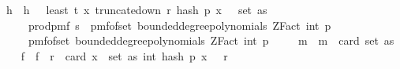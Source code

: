 \begin{isabellebody}
\ h\ \ {\isachardoublequoteopen}h\ {\isacharequal}{\kern0pt}\ {\isacharparenleft}{\kern0pt}{\isasymlambda}{\isasymomega}{\isachardot}{\kern0pt}\ least\ t\ {\isacharparenleft}{\kern0pt}{\isacharparenleft}{\kern0pt}{\isasymlambda}x{\isachardot}{\kern0pt}\ truncate{\isacharunderscore}{\kern0pt}down\ r\ {\isacharparenleft}{\kern0pt}hash\ p\ x\ {\isasymomega}{\isacharparenright}{\kern0pt}{\isacharparenright}{\kern0pt}\ {\isacharbackquote}{\kern0pt}\ set\ as{\isacharparenright}{\kern0pt}{\isacharparenright}{\kern0pt}{\isachardoublequoteclose}\isanewline
\ \ \isamarkupfalse%
\ {\isasymOmega}\ \ {\isachardoublequoteopen}{\isasymOmega}\ {\isacharequal}{\kern0pt}\ prod{\isacharunderscore}{\kern0pt}pmf\ {\isacharbraceleft}{\kern0pt}{}{\isachardot}{\kern0pt}{\isachardot}{\kern0pt}{\isacharless}{\kern0pt}s{\isacharbraceright}{\kern0pt}\ {\isacharparenleft}{\kern0pt}{\isasymlambda}{\isacharunderscore}{\kern0pt}{\isachardot}{\kern0pt}\ pmf{\isacharunderscore}{\kern0pt}of{\isacharunderscore}{\kern0pt}set\ {\isacharparenleft}{\kern0pt}bounded{\isacharunderscore}{\kern0pt}degree{\isacharunderscore}{\kern0pt}polynomials\ {\isacharparenleft}{\kern0pt}ZFact\ {\isacharparenleft}{\kern0pt}int\ p{\isacharparenright}{\kern0pt}{\isacharparenright}{\kern0pt}\ {}{\isacharparenright}{\kern0pt}{\isacharparenright}{\kern0pt}{\isachardoublequoteclose}\isanewline
\ \ \isamarkupfalse%
\ {\isasymOmega}\ \ {\isachardoublequoteopen}{\isasymOmega}\ {\isacharequal}{\kern0pt}\ pmf{\isacharunderscore}{\kern0pt}of{\isacharunderscore}{\kern0pt}set\ {\isacharparenleft}{\kern0pt}bounded{\isacharunderscore}{\kern0pt}degree{\isacharunderscore}{\kern0pt}polynomials\ {\isacharparenleft}{\kern0pt}ZFact\ {\isacharparenleft}{\kern0pt}int\ p{\isacharparenright}{\kern0pt}{\isacharparenright}{\kern0pt}\ {}{\isacharparenright}{\kern0pt}{\isachardoublequoteclose}\isanewline
\ \ \isamarkupfalse%
\ m\ \ {\isachardoublequoteopen}m\ {\isacharequal}{\kern0pt}\ card\ {\isacharparenleft}{\kern0pt}set\ as{\isacharparenright}{\kern0pt}{\isachardoublequoteclose}\isanewline
\isanewline
\ \ \isamarkupfalse%
\ f\ \ {\isachardoublequoteopen}f\ {\isacharequal}{\kern0pt}\ {\isacharparenleft}{\kern0pt}{\isasymlambda}r\ {\isasymomega}{\isachardot}{\kern0pt}\ card\ {\isacharbraceleft}{\kern0pt}x\ {\isasymin}\ set\ as{\isachardot}{\kern0pt}\ int\ {\isacharparenleft}{\kern0pt}hash\ p\ x\ {\isasymomega}{\isacharparenright}{\kern0pt}\ {\isasymle}\ r{\isacharbraceright}{\kern0pt}{\isacharparenright}{\kern0pt}{\isachardoublequoteclose}\isanewline

\end{isabellebody}
